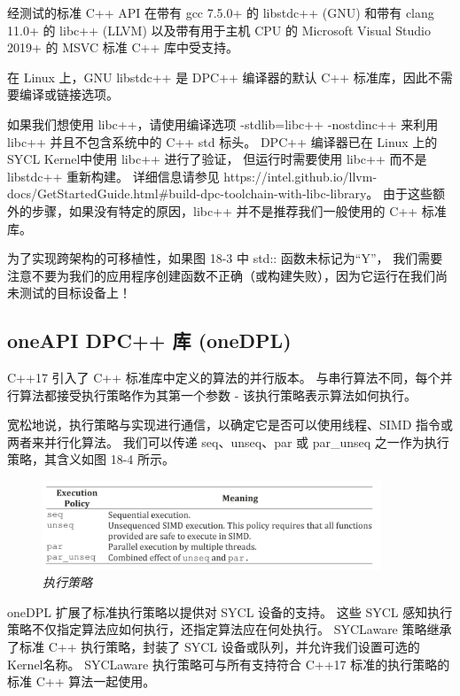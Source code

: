 经测试的标准 C++ API 在带有 gcc 7.5.0+ 的 libstdc++ (GNU) 
和带有 clang 11.0+ 的 libc++ (LLVM) 
以及带有用于主机 CPU 的 Microsoft Visual Studio 2019+ 的 MSVC 标准 C++ 库中受支持。

在 Linux 上，GNU libstdc++ 是 DPC++ 编译器的默认 C++ 标准库，因此不需要编译或链接选项。

如果我们想使用 libc++，请使用编译选项 -stdlib=libc++ -nostdinc++ 来利用 libc++ 
并且不包含系统中的 C++ std 标头。 
DPC++ 编译器已在 Linux 上的 SYCL Kernel中使用 libc++ 进行了验证，
但运行时需要使用 libc++ 而不是 libstdc++ 重新构建。 
详细信息请参见 https://intel.github.io/llvm-docs/GetStartedGuide.html\#build-dpc-toolchain-with-libc-library。 
由于这些额外的步骤，如果没有特定的原因，libc++ 并不是推荐我们一般使用的 C++ 标准库。

\begin{remark}
	为了实现跨架构的可移植性，如果图 18-3 中 std:: 函数未标记为“Y”，
	我们需要注意不要为我们的应用程序创建函数不正确（或构建失败），因为它运行在我们尚未测试的目标设备上！
\end{remark}

\subsection{oneAPI DPC++ 库 (oneDPL)}
C++17 引入了 C++ 标准库中定义的算法的并行版本。 
与串行算法不同，每个并行算法都接受执行策略作为其第一个参数 - 该执行策略表示算法如何执行。

宽松地说，执行策略与实现进行通信，以确定它是否可以使用线程、SIMD 指令或两者来并行化算法。 
我们可以传递 seq、unseq、par 或 par\_unseq 之一作为执行策略，其含义如图 18-4 所示。

\begin{figure}[H]
	\centering
	\includegraphics[width=0.9\textwidth]{figs/F18.4.png}
	\caption{\textit{执行策略 }}
\end{figure}

oneDPL 扩展了标准执行策略以提供对 SYCL 设备的支持。 
这些 SYCL 感知执行策略不仅指定算法应如何执行，还指定算法应在何处执行。 
SYCLaware 策略继承了标准 C++ 执行策略，封装了 SYCL 设备或队列，并允许我们设置可选的Kernel名称。 
SYCLaware 执行策略可与所有支持符合 C++17 标准的执行策略的标准 C++ 算法一起使用。

